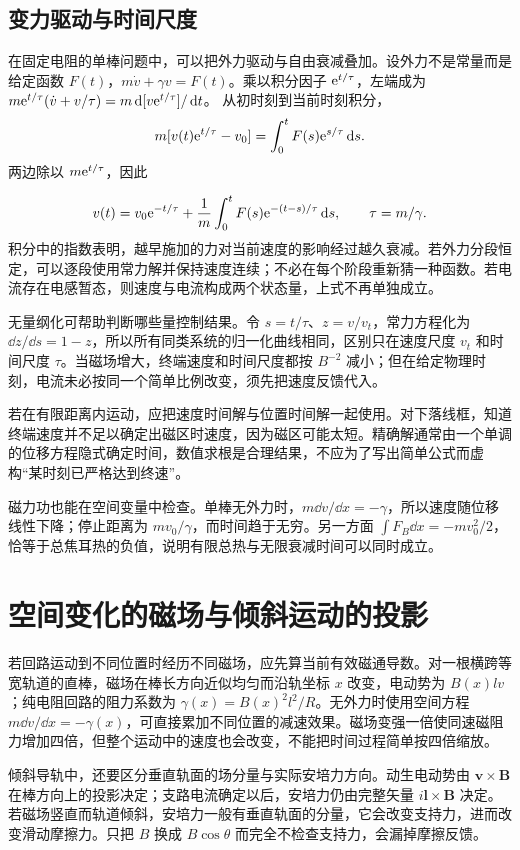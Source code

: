 \subsection{变力驱动与时间尺度}

在固定电阻的单棒问题中，可以把外力驱动与自由衰减叠加。设外力不是常量而是给定函数 $F(t)$，$m\dot v+\gamma v=F(t)$。乘以积分因子 $\mathrm e^{t/\tau}$，左端成为
$m\mathrm e^{t/\tau}(\dot v+v/\tau)=m\mathop{}\!\mathrm d[v\mathrm e^{t/\tau}]/\mathop{}\!\mathrm d t$。
从初时刻到当前时刻积分，
\[
m[v(t)\mathrm e^{t/\tau}-v_0]=\int_0^tF(s)\mathrm e^{s/\tau}\mathop{}\!\mathrm d s.
\]
两边除以 $m\mathrm e^{t/\tau}$，因此

\[v(t)=v_0\mathrm e^{-t/\tau}+\frac1m\int_0^t F(s)\mathrm e^{-(t-s)/\tau}\mathop{}\!\mathrm d s,\qquad\tau=m/\gamma.\]
积分中的指数表明，越早施加的力对当前速度的影响经过越久衰减。若外力分段恒定，可以逐段使用常力解并保持速度连续；不必在每个阶段重新猜一种函数。若电流存在电感暂态，则速度与电流构成两个状态量，上式不再单独成立。


无量纲化可帮助判断哪些量控制结果。令 $s=t/\tau$、$z=v/v_t$，常力方程化为 $\dd z/\dd s=1-z$，所以所有同类系统的归一化曲线相同，区别只在速度尺度 $v_t$ 和时间尺度 $\tau$。当磁场增大，终端速度和时间尺度都按 $B^{-2}$ 减小；但在给定物理时刻，电流未必按同一个简单比例改变，须先把速度反馈代入。


若在有限距离内运动，应把速度时间解与位置时间解一起使用。对下落线框，知道终端速度并不足以确定出磁区时速度，因为磁区可能太短。精确解通常由一个单调的位移方程隐式确定时间，数值求根是合理结果，不应为了写出简单公式而虚构“某时刻已严格达到终速”。


磁力功也能在空间变量中检查。单棒无外力时，$m\dd v/\dd x=-\gamma$，所以速度随位移线性下降；停止距离为 $mv_0/\gamma$，而时间趋于无穷。另一方面 $\int F_B\dd x=-mv_0^2/2$，恰等于总焦耳热的负值，说明有限总热与无限衰减时间可以同时成立。



\section{空间变化的磁场与倾斜运动的投影}

若回路运动到不同位置时经历不同磁场，应先算当前有效磁通导数。对一根横跨等宽轨道的直棒，磁场在棒长方向近似均匀而沿轨坐标 $x$ 改变，电动势为 $B(x)lv$；纯电阻回路的阻力系数为 $\gamma(x)=B(x)^2l^2/R$。无外力时使用空间方程 $m\dd v/\dd x=-\gamma(x)$，可直接累加不同位置的减速效果。磁场变强一倍使同速磁阻力增加四倍，但整个运动中的速度也会改变，不能把时间过程简单按四倍缩放。


倾斜导轨中，还要区分垂直轨面的场分量与实际安培力方向。动生电动势由 $\bm v\times\bm B$ 在棒方向上的投影决定；支路电流确定以后，安培力仍由完整矢量 $i\bm l\times\bm B$ 决定。若磁场竖直而轨道倾斜，安培力一般有垂直轨面的分量，它会改变支持力，进而改变滑动摩擦力。只把 $B$ 换成 $B\cos\theta$ 而完全不检查支持力，会漏掉摩擦反馈。


